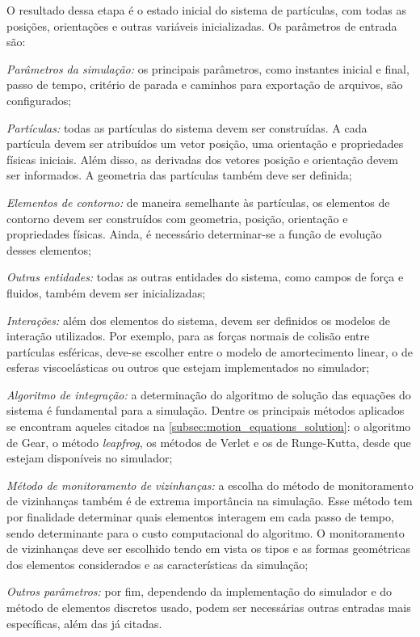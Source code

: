 O resultado dessa etapa é o estado inicial do sistema de partículas, com todas as posições, orientações e outras variáveis inicializadas. Os parâmetros de entrada são:
\begin{alineas}
\item \textit{Parâmetros da simulação:} os principais parâmetros, como instantes inicial e final, passo de tempo, critério de parada e caminhos para exportação de arquivos, são configurados;
\item \textit{Partículas:} todas as partículas do sistema devem ser construídas. A cada partícula devem ser atribuídos um vetor posição, uma orientação e propriedades físicas iniciais. Além disso, as derivadas dos vetores posição e orientação devem ser informados. A geometria das partículas também deve ser definida;
\item \textit{Elementos de contorno:} de maneira semelhante às partículas, os elementos de contorno devem ser construídos com geometria, posição, orientação e propriedades físicas. Ainda, é necessário determinar-se a função de evolução desses elementos;
\item \textit{Outras entidades:} todas as outras entidades do sistema, como campos de força e fluidos, também devem ser inicializadas;
\item \textit{Interações:} além dos elementos do sistema, devem ser definidos os modelos de interação utilizados. Por exemplo, para as forças normais de colisão entre partículas esféricas, deve-se escolher entre o modelo de amortecimento linear, o de esferas viscoelásticas ou outros que estejam implementados no simulador;
\item \textit{Algoritmo de integração:} a determinação do algoritmo de solução das equações do sistema é fundamental para a simulação. Dentre os principais métodos aplicados se encontram aqueles citados na \cref{subsec:motion_equations_solution}: o algoritmo de Gear, o método \textit{leapfrog}, os métodos de Verlet e os de Runge-Kutta, desde que estejam disponíveis no simulador;
\item \textit{Método de monitoramento de vizinhanças:} a escolha do método de monitoramento de vizinhanças também é de extrema importância na simulação. Esse método tem por finalidade determinar quais elementos interagem em cada passo de tempo, sendo determinante para o custo computacional do algoritmo. O monitoramento de vizinhanças deve ser escolhido tendo em vista os tipos e as formas geométricas dos elementos considerados e as características da simulação;
\item \textit{Outros parâmetros:} por fim, dependendo da implementação do simulador e do método de elementos discretos usado, podem ser necessárias outras entradas mais específicas, além das já citadas.
\end{alineas}

